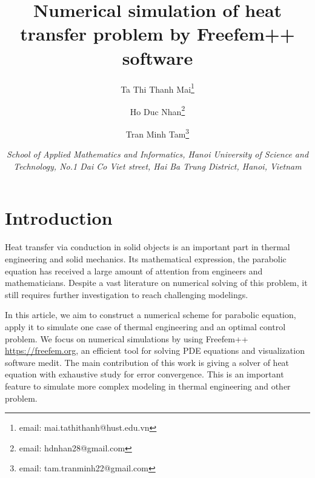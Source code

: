 \documentclass[twocolumn]{article}
\title{\bf Numerical simulation of heat transfer problem by Freefem++ software}
\author{Ta Thi Thanh Mai\thanks{email: mai.tathithanh@hust.edu.vn}\and Ho Duc Nhan\thanks{email: hdnhan28@gmail.com}\and Tran Minh Tam\thanks{email: tam.tranminh22@gmail.com}}
\date{\footnotesize\textit{School of Applied Mathematics and Informatics, Hanoi University of Science and Technology, No.1 Dai Co Viet street, Hai Ba Trung District, Hanoi, Vietnam}}
\begin{document}
\saythanks

\section{Introduction}
\quad Heat transfer via conduction in solid objects is an important part in thermal engineering and solid mechanics. Its mathematical expression, the parabolic equation has received a large amount of attention from engineers and mathematicians. Despite a vast literature on numerical solving of this problem, it still requires further investigation to reach challenging modelings. 

In this article, we aim to construct a numerical scheme for parabolic equation, apply it to simulate one case of thermal engineering and an optimal control problem. We focus on numerical simulations by using Freefem++ \url{https://freefem.org}, an efficient tool for solving PDE equations and visualization software medit\cite{Fre01}. The main contribution of this work is giving a solver of heat equation with exhaustive study for error convergence. This is an important feature to simulate more complex modeling in thermal engineering and other problem.
\end{document}
